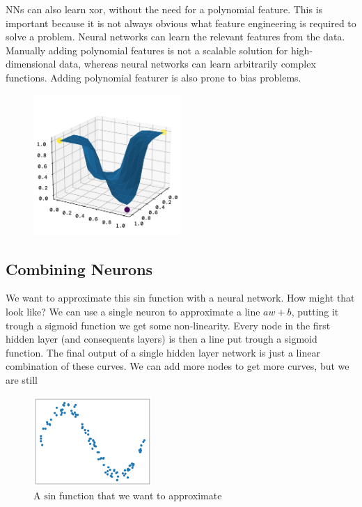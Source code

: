 \documentclass[twoside,11pt]{report}
\begin{document}
NNs can also learn xor, without the need for a polynomial feature. This is important because it is not 
always obvious what feature engineering is required to solve a problem. Neural networks can learn the 
relevant 
features from the data. Manually adding polynomial features is not a scalable solution for 
high-dimensional data,
whereas neural networks can learn arbitrarily complex functions. Adding polynomial featurer 
is also prone to 
bias problems.


\begin{figure}[!h]
    \begin{center}
        \includegraphics[width=0.5\textwidth]{../runsAndFigures/xor_nn.png}
    \end{center}
    \caption{}\label{fig:}
\end{figure}



%
\subsection*{Combining Neurons}
\label{app:neuronscombined}

We want to approximate this sin function with a neural network. How might that look like?
We can use a single neuron to approximate a line $a w + b$, putting it trough a sigmoid function
we get some non-linearity. Every node in the first hidden layer (and consequents layers) is then 
a line put trough a sigmoid function. The final output of a single hidden layer network is just
a linear combination of these curves. We can add more nodes to get more curves, but we are still


\begin{figure}
    \begin{center}
        \includegraphics[width=0.4\textwidth]{../runsAndFigures/sin.png}
    \end{center}
    \caption{A $\text{sin}$ function that we want to approximate}\label{fig:sin}
\end{figure}
\end{document}

